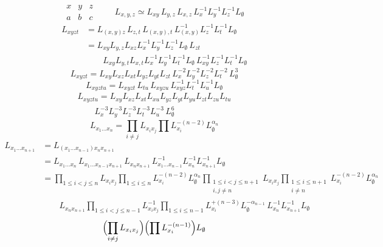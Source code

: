\documentclass[11pt,a4paper]{article}
\begin{document}
\[
\begin{matrix} x & y & z \\ a & b & c \end{matrix}
\qquad
\boxed{\, L_{x,y,z} \simeq L_{xy}\, L_{y,z}\, L_{x,z}\, L_x^{-1} L_y^{-1} L_z^{-1} L_{\emptyset} \,}
\]
\begin{align*}
L_{xyzt} &= L_{(x,y)z}\, L_{z,t}\, L_{(x,y),t}\, L_{(x,y)}^{-1} L_z^{-1} L_t^{-1} L_{\emptyset} \\
&= L_{xy} L_{y,z} L_{xz} L_x^{-1} L_y^{-1} L_z^{-1} L_{\emptyset}\, L_{zt} \\
&\qquad L_{xy} L_{y,t} L_{x,t} L_x^{-1} L_y^{-1} L_t^{-1} L_{\emptyset}\,
L_{xy}^{-1} L_z^{-1} L_t^{-1} L_{\emptyset}
\end{align*}
\[
\boxed{\, L_{xyzt} = L_{xy} L_{xz} L_{xt} L_{yz} L_{yt} L_{zt}\,
L_x^{-2} L_y^{-2} L_z^{-2} L_t^{-2}\, L_{\emptyset}^{3} \,}
\]
\[
L_{xyztu} = L_{xyzt}\, L_{tu}\, L_{xyzu}\, L_{xyz}^{-1} L_t^{-1} L_u^{-1} L_{\emptyset}
\]
\[
\boxed{\,
\begin{array}{l}
L_{xyztu} = L_{xy} L_{xz} L_{xt} L_{xu} L_{yz} L_{yt} L_{yu} L_{zt} L_{zu} L_{tu} \\
\qquad L_x^{-3} L_y^{-3} L_z^{-3} L_t^{-3} L_u^{-3}\, L_{\emptyset}^{6}
\end{array}\,}
\]
\[
L_{x_1 \dots x_n} = \prod_{i \neq j} L_{x_i x_j} \prod L_{x_i}^{-(n-2)} L_{\emptyset}^{\alpha_n}
\]
\begin{align*}
L_{x_1 \dots x_{n+1}} &= L_{(x_1 \dots x_{n-1}) x_n x_{n+1}} \\
&= L_{x_1 \dots x_n}\, L_{x_1 \dots x_{n-1} x_{n+1}}\, L_{x_n x_{n+1}}\,
L_{x_1 \dots x_{n-1}}^{-1} L_{x_n}^{-1} L_{x_{n+1}}^{-1} L_{\emptyset} \\
&= \prod_{1 \leq i < j \leq n} L_{x_i x_j} \prod_{1 \leq i \leq n} L_{x_i}^{-(n-2)} L_{\emptyset}^{\alpha_n}
\prod_{\substack{1 \leq i < j \leq n+1 \\ i, j \neq n}} L_{x_i x_j}
\prod_{\substack{1 \leq i \leq n+1 \\ i \neq n}} L_{x_i}^{-(n-2)} L_{\emptyset}^{\alpha_n} \\
&\qquad L_{x_n x_{n+1}} \prod_{1 \leq i < j \leq n-1} L_{x_i x_j}^{-1}
\prod_{1 \leq i \leq n-1} L_{x_i}^{+(n-3)} L_{\emptyset}^{-\alpha_{n-1}}\,
L_{x_n}^{-1} L_{x_{n+1}}^{-1} L_{\emptyset}
\end{align*}
\[
\Bigl(\prod_{i \neq j} L_{x_i x_j}\Bigr) \Bigl(\prod L_{x_i}^{-(n-1)}\Bigr) L_{\emptyset}
\]
\end{document}
